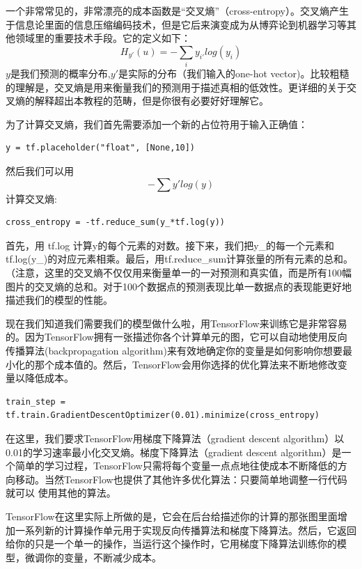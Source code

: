 一个非常常见的，非常漂亮的成本函数是“交叉熵”（cross-entropy）。交叉熵产生于信息论里面的信息压缩编码技术，但是它后来演变成为从博弈论到机器学习等其他领域里的重要技术手段。它的定义如下：
\begin{equation}
H_{y'}(u) = -\sum_i{y_{i'}log(y_i)}
\end{equation}
$y$是我们预测的概率分布,$y'$是实际的分布（我们输入的one-hot vector)。比较粗糙的理解是，交叉熵是用来衡量我们的预测用于描述真相的低效性。更详细的关于交叉熵的解释超出本教程的范畴，但是你很有必要好好理解它。

为了计算交叉熵，我们首先需要添加一个新的占位符用于输入正确值：
\begin{lstlisting}
y = tf.placeholder("float", [None,10])
\end{lstlisting}
然后我们可以用
\begin{equation}
-\sum{y'log(y)}
\end{equation}
计算交叉熵:

\begin{lstlisting}
cross_entropy = -tf.reduce_sum(y_*tf.log(y))
\end{lstlisting}

首先，用 tf.log 计算y的每个元素的对数。接下来，我们把y\_的每一个元素和tf.log(y\_)的对应元素相乘。最后，用tf.reduce\_sum计算张量的所有元素的总和。（注意，这里的交叉熵不仅仅用来衡量单一的一对预测和真实值，而是所有100幅图片的交叉熵的总和。对于100个数据点的预测表现比单一数据点的表现能更好地描述我们的模型的性能。

现在我们知道我们需要我们的模型做什么啦，用TensorFlow来训练它是非常容易的。因为TensorFlow拥有一张描述你各个计算单元的图，它可以自动地使用反向传播算法(backpropagation algorithm)来有效地确定你的变量是如何影响你想要最小化的那个成本值的。然后，TensorFlow会用你选择的优化算法来不断地修改变量以降低成本。

\begin{lstlisting}
train_step = tf.train.GradientDescentOptimizer(0.01).minimize(cross_entropy)
\end{lstlisting}

在这里，我们要求TensorFlow用梯度下降算法（gradient descent algorithm）以0.01的学习速率最小化交叉熵。梯度下降算法（gradient descent algorithm）是一个简单的学习过程，TensorFlow只需将每个变量一点点地往使成本不断降低的方向移动。当然TensorFlow也提供了其他许多优化算法：只要简单地调整一行代码就可以
使用其他的算法。

TensorFlow在这里实际上所做的是，它会在后台给描述你的计算的那张图里面增加一系列新的计算操作单元用于实现反向传播算法和梯度下降算法。然后，它返回给你的只是一个单一的操作，当运行这个操作时，它用梯度下降算法训练你的模型，微调你的变量，不断减少成本。

